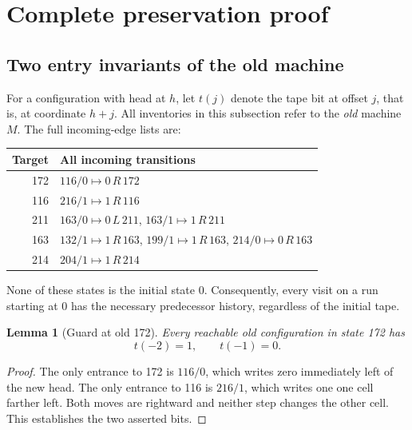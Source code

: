 \documentclass[11pt,letterpaper]{article}
\newcommand{\act}[3]{#1\,#2\,#3}
\newtheorem{lemma}[theorem]{Lemma}
\begin{document}
\section{Complete preservation proof}\label{sec:proof}
\subsection{Two entry invariants of the old machine}
For a configuration with head at $h$, let $t(j)$ denote the tape bit at
offset $j$, that is, at coordinate $h+j$.
All inventories in this subsection refer to the \emph{old} machine $M$.
The full incoming-edge lists are:
\begin{center}\small
\begin{tabular}{@{}rl@{}}
\toprule
Target & All incoming transitions\\
\midrule
172 & $116/0\mapsto\act0R{172}$\\
116 & $216/1\mapsto\act1R{116}$\\
211 & $163/0\mapsto\act0L{211}$,\quad
       $163/1\mapsto\act1R{211}$\\
163 & $132/1\mapsto\act1R{163}$,\quad
       $199/1\mapsto\act1R{163}$,\quad
       $214/0\mapsto\act0R{163}$\\
214 & $204/1\mapsto\act1R{214}$\\
\bottomrule
\end{tabular}
\end{center}
None of these states is the initial state 0. Consequently, every visit on
a run starting at 0 has the necessary predecessor history, regardless
of the initial tape.

\begin{lemma}[Guard at old 172]\label{lem:172}
Every reachable old configuration in state 172 has
\[
                         t(-2)=1,\qquad t(-1)=0.
\]
\end{lemma}
\begin{proof}
The only entrance to 172 is $116/0$, which writes zero immediately left of
the new head. The only entrance to 116 is $216/1$, which writes one one cell
farther left. Both moves are rightward and neither step changes the other
cell. This establishes the two asserted bits.
\end{proof}
\end{document}
